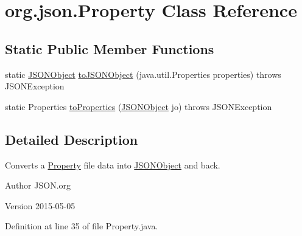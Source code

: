 \hypertarget{classorg_1_1json_1_1Property}{\section{org.\-json.\-Property Class Reference}
\label{classorg_1_1json_1_1Property}
}
\subsection*{Static Public Member Functions}
\begin{DoxyCompactItemize}
\item 
static \hyperlink{classorg_1_1json_1_1JSONObject}{J\-S\-O\-N\-Object} \hyperlink{classorg_1_1json_1_1Property_aaf04335208523a4f7b41eb9edf3939fb}{to\-J\-S\-O\-N\-Object} (java.\-util.\-Properties properties)  throws J\-S\-O\-N\-Exception 
\item 
static Properties \hyperlink{classorg_1_1json_1_1Property_adbaf75a2454e0563ba90f9adc2822850}{to\-Properties} (\hyperlink{classorg_1_1json_1_1JSONObject}{J\-S\-O\-N\-Object} jo)  throws J\-S\-O\-N\-Exception 
\end{DoxyCompactItemize}


\subsection{Detailed Description}
Converts a \hyperlink{classorg_1_1json_1_1Property}{Property} file data into \hyperlink{classorg_1_1json_1_1JSONObject}{J\-S\-O\-N\-Object} and back. \begin{DoxyAuthor}{Author}
J\-S\-O\-N.\-org 
\end{DoxyAuthor}
\begin{DoxyVersion}{Version}
2015-\/05-\/05 
\end{DoxyVersion}


Definition at line 35 of file Property.\-java.



